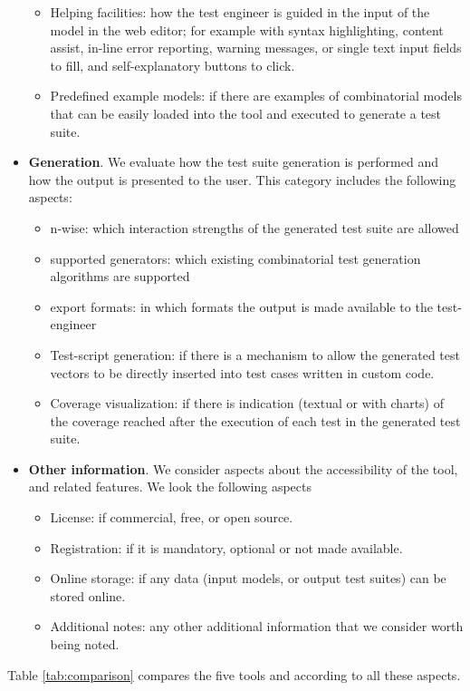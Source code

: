\begin{tikzborder}{\cite{Gargantini16:validation}}
\begin{tikzborder}{\cite{gargantini_combinatorial_2017}}
\begin{tikzborder}{\cite{gargantini_combinatorial_2017}}
\begin{tikzborder}{\cite{garn2019}}
\begin{tikzborder}{\cite{arcaini2019achieving}}
\begin{tikzborder}{}
\begin{itemize}
\begin{itemize}
		\item Helping facilities: how the test engineer is guided in the input of the model in the web editor; for example with syntax highlighting, content assist, in-line error reporting, warning messages, or single text input fields to fill, and self-explanatory buttons to click.
		\item Predefined example models: if there are examples of combinatorial models that can be easily loaded into the tool and executed to generate a test suite.
	\end{itemize} 
	\item \textbf{Generation}. We evaluate how the test suite generation is performed and how the output is presented to the user. This category includes the following aspects:
	\begin{itemize}
		\item n-wise: which interaction strengths of the generated test suite are allowed
		\item supported generators: which existing combinatorial test generation algorithms are supported
		\item export formats: in which formats the output is made available to the test-engineer
		\item Test-script generation: if there is a mechanism to allow the generated test vectors to be directly inserted into test cases written in custom code.
		\item Coverage visualization: if there is indication (textual or with charts) of the coverage reached after the execution of each test in the generated test suite.
	\end{itemize} 
	\item \textbf{Other information}. We consider aspects about the accessibility of the tool, and related features. We look the following aspects
	\begin{itemize}
		\item License: if commercial, free, or open source.
		\item Registration: if it is mandatory, optional or not made available.
		\item Online storage: if any data (input models, or output test suites) can be stored online.
		\item Additional notes: any other additional information that we consider worth being noted.
	\end{itemize} 
\end{itemize}

Table \ref{tab:comparison} compares the five tools and \ctwedge according to all these aspects.


\end{tikzborder}
\end{tikzborder}
\end{tikzborder}
\end{tikzborder}
\end{tikzborder}
\end{tikzborder}
